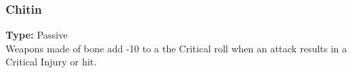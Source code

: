 \subsubsection{Chitin}
\label{iqty:chitin}
\textbf{Type:} Passive\\
Weapons made of bone add -10 to a the Critical roll when an attack results in a
Critical Injury or hit.
